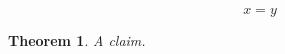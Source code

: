 \documentclass{article}
\def\thmcnter{equation}
\newtheorem{thm}[\thmcnter]{Theorem}
\begin{document}
\begin{equation}x=y\end{equation}
\begin{thm}A claim.\end{thm}
\end{document}
